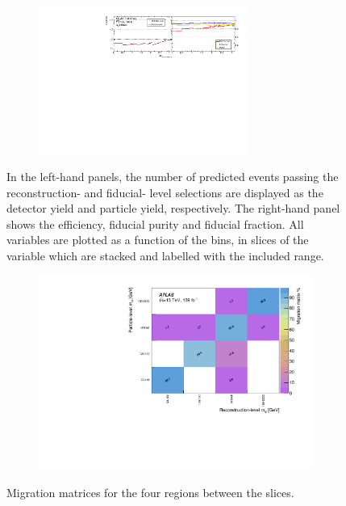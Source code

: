 \begin{figure}[htb]
\begin{subfigure}{.99\textwidth}
    \end{subfigure}
    \begin{subfigure}{.99\textwidth}\centering
        \includegraphics[width = 0.75\textwidth]{Figures/m4l/UnfoldingStudies/v014_inputs/deltaPhiLeadingLeptons_m4loffshellinputs.pdf}
    \end{subfigure}
    \caption{In the left-hand panels, the number of predicted events passing the reconstruction- and fiducial- level selections are displayed as the detector yield and particle yield, respectively. The right-hand panel shows the efficiency, fiducial purity and fiducial fraction. All variables are plotted as a function of the \dPhill bins, in slices of the \mFourL variable which are stacked and labelled with the included \mFourL range.
    \label{fig:dphiunf}}
\end{figure}  

\FloatBarrier
\clearpage

\begin{figure}[htb]
  \centering
  \begin{subfigure}{.65\textwidth}\centering\includegraphics[width = 0.99\textwidth]{Figures/m4l/UnfoldingStudies/v014_matrices/inclusive_vs_m4lMatrix.pdf}\end{subfigure}
 \caption{Migration matrices for the four \mFourL regions between the slices. \label{fig:inclvm4lmat}}
\end{figure}

